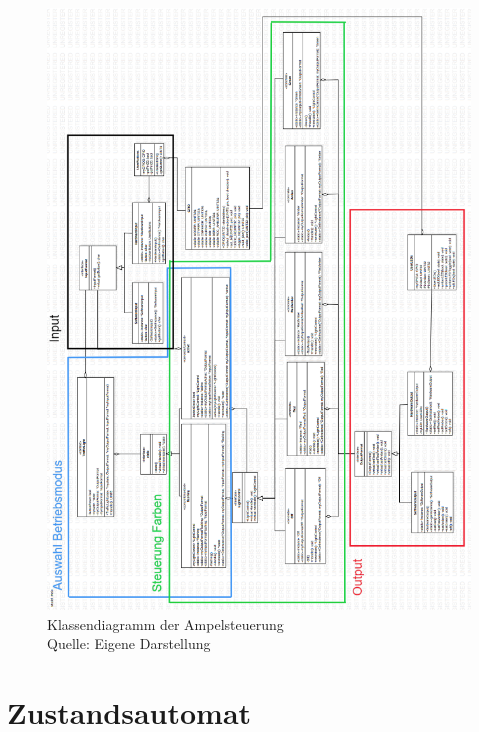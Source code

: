 \begin{figure}[H] 
	\centering
	\includegraphics[width=1.0\textwidth]{images/08.png}
	\caption{Klassendiagramm der Ampelsteuerung \protect \\ Quelle: Eigene Darstellung }
	\label{fig:grafik8}
\end{figure}

\section{Zustandsautomat}

